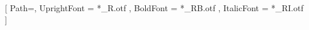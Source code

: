 \setmainfont{LinBiolinum}[
Path=,
UprightFont = *_R.otf ,
BoldFont = *_RB.otf ,
ItalicFont = *_RI.otf
]



\author[Atkey]{Dr.~Robert Atkey}
\date[]{}

\newcommand{\weeksection}[1]{%
  \section{\thetitle{}, Part~\thesection : #1}
  \begin{frame}
    \begin{center}
      \textcolor{black!60}{\thetitle{}, Part \thesection}\\
      {\Huge #1}
    \end{center}
  \end{frame}}

\newcommand{\weektitle}[2]{\def\thetitle{#2}
\title[CS208 - Topic #1]{CS208 (Semester 1) Topic #1 : #2}}

\newcommand{\assigned}{:}

\newcommand{\forcedto}{\assigned_f}
\newcommand{\decideto}{\assigned_d}
